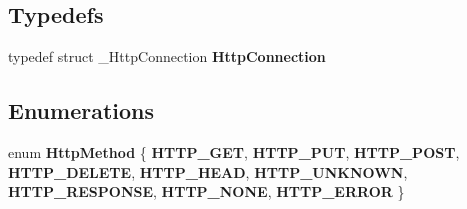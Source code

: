 \subsection*{Typedefs}
\begin{DoxyCompactItemize}
\item 
\mbox{\label{group__http__connection_ga29126786f6c9add04f306c51c4113994}} 
typedef struct \+\_\+\+Http\+Connection {\bfseries Http\+Connection}
\end{DoxyCompactItemize}
\subsection*{Enumerations}
\begin{DoxyCompactItemize}
\item 
\mbox{\label{group__http__connection_ga4353a75834bb35c4acd80b51434eef59}} 
enum {\bfseries Http\+Method} \{ \newline
{\bfseries H\+T\+T\+P\+\_\+\+G\+ET}, 
\newline
{\bfseries H\+T\+T\+P\+\_\+\+P\+UT}, 
\newline
{\bfseries H\+T\+T\+P\+\_\+\+P\+O\+ST}, 
\newline
{\bfseries H\+T\+T\+P\+\_\+\+D\+E\+L\+E\+TE}, 
\newline
{\bfseries H\+T\+T\+P\+\_\+\+H\+E\+AD}, 
\newline
{\bfseries H\+T\+T\+P\+\_\+\+U\+N\+K\+N\+O\+WN}, 
\newline
{\bfseries H\+T\+T\+P\+\_\+\+R\+E\+S\+P\+O\+N\+SE}, 
\newline
{\bfseries H\+T\+T\+P\+\_\+\+N\+O\+NE}, 
\newline
{\bfseries H\+T\+T\+P\+\_\+\+E\+R\+R\+OR}
 \}
\end{DoxyCompactItemize}
